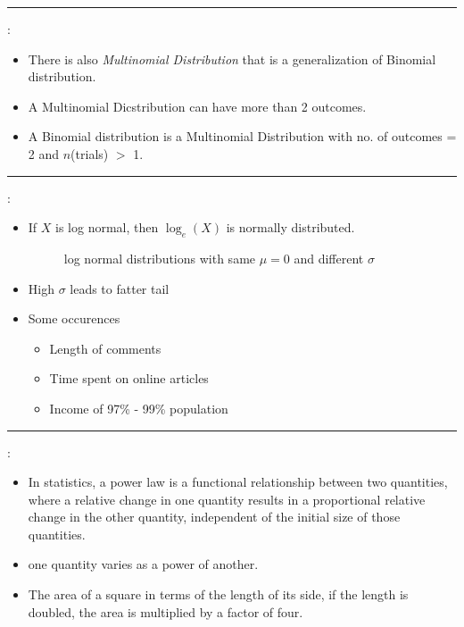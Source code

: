 \documentclass[	DIV=calc,%
paper=a4,%
fontsize=11pt,%
twocolumn]{scrartcl} %
\newcommand{\hformbar}[1]{\vspace{5pt}\hrule\vspace{10pt}} %
\newcommand{\formdesc}[1]{\noindent\textbf{#1}}
\begin{document}
\hformbar

\formdesc{Multinomial Distribution}:
\begin{itemize}
		\item There is also \emph{Multinomial Distribution} that is a generalization of Binomial distribution.
		
		\item A Multinomial Dicstribution can have more than 2 outcomes.
		
		\item A Binomial distribution is a Multinomial Distribution with no. of outcomes = 2 and $n$(trials) $>$ 1.
		
\end{itemize}

\hformbar

\formdesc{Log-normal distribution}:
	\begin{itemize}
		\item If $X$ is log normal, then $\log_e(X)$ is normally distributed.
			\begin{figure}[ht!]
			\centering
			\graphicspath{ {images/math/} }
			\caption{log normal distributions with same $\mu=0$ and different $\sigma$}
			
		\end{figure}
	\item High $\sigma$ leads to fatter tail
	\item Some occurences
		\begin{itemize}
			\item Length of comments
			\item Time spent on online articles
			\item Income of 97\% - 99\% population
		\end{itemize}
	\end{itemize}


\hformbar

\formdesc{Power law}:
	\begin{itemize}
		\item In statistics, a power law is a functional relationship between two quantities, where a relative change in one quantity results in a proportional relative change in the other quantity, independent of the initial size of those quantities.
		\item one quantity varies as a power of another.
		\item The area of a square in terms of the length of its side, if the length is doubled, the area is multiplied by a factor of four.
	\end{itemize}
\end{document}

